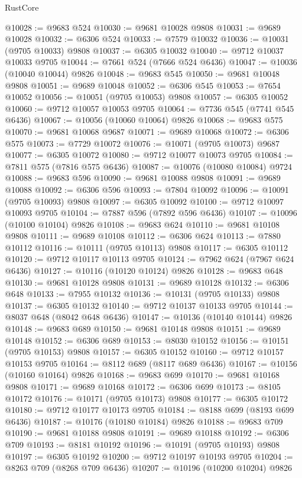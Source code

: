 \begin{lexlean}{RustCore}
\begin{coremodule}
@10028 := @9683 @524
@10030 := @9681 @10028 @9808
@10031 := @9689 @10028
@10032 := @6306 @524
@10033 := @7579 @10032
@10036 := @10031 (@9705 @10033) @9808
@10037 := @6305 @10032
@10040 := @9712 @10037 @10033 @9705
@10044 := @7661 @524 (@7666 @524 @6436)
@10047 := @10036 (@10040 @10044) @9826
@10048 := @9683 @545
@10050 := @9681 @10048 @9808
@10051 := @9689 @10048
@10052 := @6306 @545
@10053 := @7654 @10052
@10056 := @10051 (@9705 @10053) @9808
@10057 := @6305 @10052
@10060 := @9712 @10057 @10053 @9705
@10064 := @7736 @545 (@7741 @545 @6436)
@10067 := @10056 (@10060 @10064) @9826
@10068 := @9683 @575
@10070 := @9681 @10068 @9687
@10071 := @9689 @10068
@10072 := @6306 @575
@10073 := @7729 @10072
@10076 := @10071 (@9705 @10073) @9687
@10077 := @6305 @10072
@10080 := @9712 @10077 @10073 @9705
@10084 := @7811 @575 (@7816 @575 @6436)
@10087 := @10076 (@10080 @10084) @9724
@10088 := @9683 @596
@10090 := @9681 @10088 @9808
@10091 := @9689 @10088
@10092 := @6306 @596
@10093 := @7804 @10092
@10096 := @10091 (@9705 @10093) @9808
@10097 := @6305 @10092
@10100 := @9712 @10097 @10093 @9705
@10104 := @7887 @596 (@7892 @596 @6436)
@10107 := @10096 (@10100 @10104) @9826
@10108 := @9683 @624
@10110 := @9681 @10108 @9808
@10111 := @9689 @10108
@10112 := @6306 @624
@10113 := @7880 @10112
@10116 := @10111 (@9705 @10113) @9808
@10117 := @6305 @10112
@10120 := @9712 @10117 @10113 @9705
@10124 := @7962 @624 (@7967 @624 @6436)
@10127 := @10116 (@10120 @10124) @9826
@10128 := @9683 @648
@10130 := @9681 @10128 @9808
@10131 := @9689 @10128
@10132 := @6306 @648
@10133 := @7955 @10132
@10136 := @10131 (@9705 @10133) @9808
@10137 := @6305 @10132
@10140 := @9712 @10137 @10133 @9705
@10144 := @8037 @648 (@8042 @648 @6436)
@10147 := @10136 (@10140 @10144) @9826
@10148 := @9683 @689
@10150 := @9681 @10148 @9808
@10151 := @9689 @10148
@10152 := @6306 @689
@10153 := @8030 @10152
@10156 := @10151 (@9705 @10153) @9808
@10157 := @6305 @10152
@10160 := @9712 @10157 @10153 @9705
@10164 := @8112 @689 (@8117 @689 @6436)
@10167 := @10156 (@10160 @10164) @9826
@10168 := @9683 @699
@10170 := @9681 @10168 @9808
@10171 := @9689 @10168
@10172 := @6306 @699
@10173 := @8105 @10172
@10176 := @10171 (@9705 @10173) @9808
@10177 := @6305 @10172
@10180 := @9712 @10177 @10173 @9705
@10184 := @8188 @699 (@8193 @699 @6436)
@10187 := @10176 (@10180 @10184) @9826
@10188 := @9683 @709
@10190 := @9681 @10188 @9808
@10191 := @9689 @10188
@10192 := @6306 @709
@10193 := @8181 @10192
@10196 := @10191 (@9705 @10193) @9808
@10197 := @6305 @10192
@10200 := @9712 @10197 @10193 @9705
@10204 := @8263 @709 (@8268 @709 @6436)
@10207 := @10196 (@10200 @10204) @9826

\end{coremodule}
\end{lexlean}

